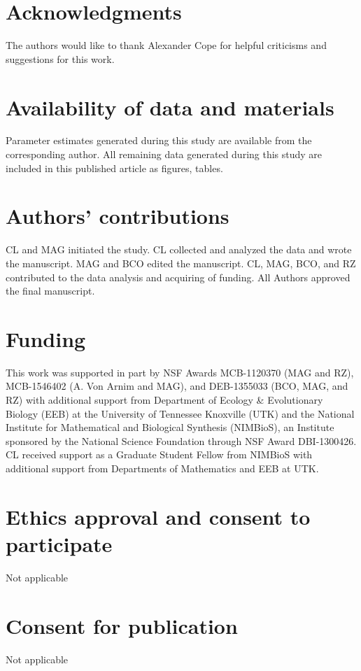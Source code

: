 \documentclass[doublespacing,linenumbers]{bmcart-modified}
\begin{document}
\begin{backmatter}
  
\section*{Acknowledgments}
The authors would like to thank Alexander Cope for helpful criticisms and suggestions for this work.

\section*{Availability of data and materials}
Parameter estimates generated during this study are available from the corresponding author.
All remaining data generated during this study are included in this published article as figures, tables.

\section*{Authors' contributions}
CL and MAG initiated the study.
CL collected and analyzed the data and wrote the manuscript.
MAG and BCO edited the manuscript.
CL, MAG, BCO, and RZ contributed to the data analysis and acquiring of funding.
All Authors approved the final manuscript.
    
\section*{Funding}
This work was supported in part by NSF Awards MCB-1120370 (MAG and RZ),  MCB-1546402 (A. Von Arnim and MAG), and DEB-1355033 (BCO, MAG, and RZ) with additional support from Department of Ecology \& Evolutionary Biology (EEB) at the University of Tennessee Knoxville (UTK) and  the National Institute for Mathematical and Biological Synthesis (NIMBioS), an Institute sponsored by the National Science Foundation through NSF Award DBI-1300426.
CL received support as a Graduate Student Fellow from NIMBioS with additional support from Departments of Mathematics and EEB at UTK. 

\section*{Ethics approval and consent to participate}
Not applicable

\section*{Consent for publication}
Not applicable


\end{backmatter}
\end{document}
